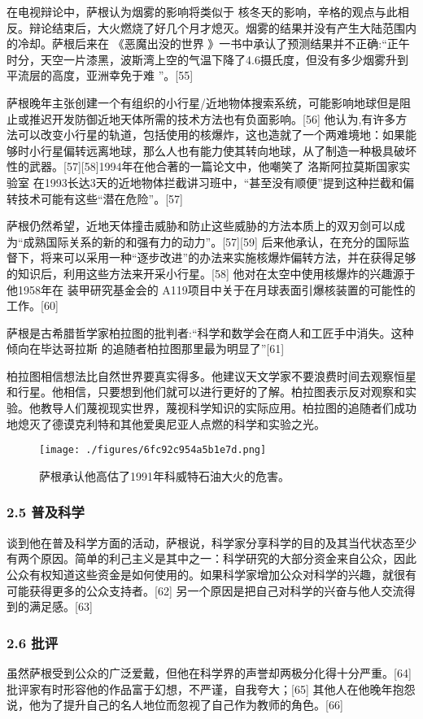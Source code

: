 在电视辩论中，萨根认为烟雾的影响将类似于 核冬天的影响，辛格的观点与此相反。辩论结束后，大火燃烧了好几个月才熄灭。烟雾的结果并没有产生大陆范围内的冷却。萨根后来在 《恶魔出没的世界 》一书中承认了预测结果并不正确:“正午时分，天空一片漆黑，波斯湾上空的气温下降了4.6摄氏度，但没有多少烟雾升到平流层的高度，亚洲幸免于难 ”。[55]

萨根晚年主张创建一个有组织的小行星/近地物体搜索系统，可能影响地球但是阻止或推迟开发防御近地天体所需的技术方法也有负面影响。[56] 他认为,有许多方法可以改变小行星的轨道，包括使用的核爆炸，这也造就了一个两难境地：如果能够时小行星偏转远离地球，那么人也有能力使其转向地球，从了制造一种极具破坏性的武器。[57][58]1994年在他合著的一篇论文中，他嘲笑了 洛斯阿拉莫斯国家实验室 在1993长达3天的近地物体拦截讲习班中，“甚至没有顺便”提到这种拦截和偏转技术可能有这些“潜在危险”。[57]

萨根仍然希望，近地天体撞击威胁和防止这些威胁的方法本质上的双刃剑可以成为“成熟国际关系的新的和强有力的动力”。[57][59] 后来他承认，在充分的国际监督下，将来可以采用一种“逐步改进”的办法来实施核爆炸偏转方法，并在获得足够的知识后，利用这些方法来开采小行星。[58] 他对在太空中使用核爆炸的兴趣源于他1958年在 装甲研究基金会的 A119项目中关于在月球表面引爆核装置的可能性的工作。[60]

萨根是古希腊哲学家柏拉图的批判者:“科学和数学会在商人和工匠手中消失。这种倾向在毕达哥拉斯 的追随者柏拉图那里最为明显了”[61]

柏拉图相信想法比自然世界要真实得多。他建议天文学家不要浪费时间去观察恒星和行星。他相信，只要想到他们就可以进行更好的了解。柏拉图表示反对观察和实验。他教导人们蔑视现实世界，蔑视科学知识的实际应用。柏拉图的追随者们成功地熄灭了德谟克利特和其他爱奥尼亚人点燃的科学和实验之光。
\begin{figure}[ht]
\centering
\texttt{[image: ./figures/6fc92c954a5b1e7d.png]}
\caption{萨根承认他高估了1991年科威特石油大火的危害。} \label{fig_Sagan_7}
\end{figure}
\subsubsection{2.5 普及科学}
谈到他在普及科学方面的活动，萨根说，科学家分享科学的目的及其当代状态至少有两个原因。简单的利己主义是其中之一：科学研究的大部分资金来自公众，因此公众有权知道这些资金是如何使用的。如果科学家增加公众对科学的兴趣，就很有可能获得更多的公众支持者。[62] 另一个原因是把自己对科学的兴奋与他人交流得到的满足感。[63]
\subsubsection{2.6 批评}
虽然萨根受到公众的广泛爱戴，但他在科学界的声誉却两极分化得十分严重。[64] 批评家有时形容他的作品富于幻想，不严谨，自我夸大；[65] 其他人在他晚年抱怨说，他为了提升自己的名人地位而忽视了自己作为教师的角色。[66]

